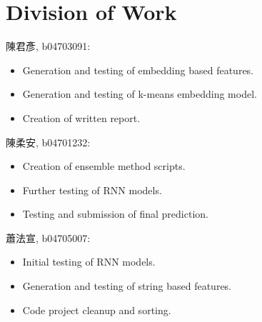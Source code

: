 \documentclass[a4paper, 12pt]{article}
\begin{document}
    \section*{Division of Work}
        陳君彥, b04703091: 
        \begin{itemize}
            \item Generation and testing of embedding based features.
            \item Generation and testing of k-means embedding model.
            \item Creation of written report.
        \end{itemize}
        陳柔安, b04701232:
        \begin{itemize}
            \item Creation of ensemble method scripts.
            \item Further testing of RNN models.
            \item Testing and submission of final prediction.
        \end{itemize}
        蕭法宣, b04705007:
        \begin{itemize}
            \item Initial testing of RNN models.
            \item Generation and testing of string based features.
            \item Code project cleanup and sorting.
        \end{itemize}
\end{document}
